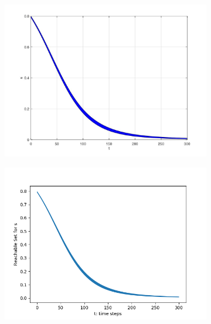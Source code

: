 \documentclass[EPiC]{easychair}
\begin{document}
\begin{figure}[h]

    \begin{subfigure}{0.5\textwidth}
    \centering
    \includegraphics[width=\textwidth]{SapoFigures/SIR/SapoSIR_S.jpg}
    \end{subfigure}
    \begin{subfigure}{0.6\textwidth}
    \centering
    \includegraphics[width=\textwidth]{SapoFigures/SIR/KaaSIR_S.png}
    \end{subfigure}
    

\end{figure}
\end{document}
